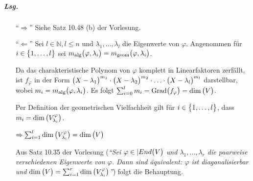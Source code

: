 \documentclass{scrreprt}
\newcommand{\Grad}{\text{Grad}}
\begin{document}
\subparagraph{Lsg.}
\begin{itemize}
\item[``$\Rightarrow$''] Siehe Satz 10.48 (b) der Vorlesung.
\item[``$\Leftarrow$''] Sei $l \in \mathbb{N}, l \leq n$ und
  $\lambda_1, \ldots, \lambda_l$ die Eigenwerte von $\varphi$.
  Angenommen für $i \in \qty\big{1, \ldots, l}$ sei
  $m_{\text{alg}}\qty\big(\varphi, \lambda_i)
  = m_{\text{geom}}\qty\big(\varphi, \lambda_i)$.

  Da das charakteristische Polynom von $\varphi$ komplett in Linearfaktoren
  zerfällt, ist $f_{\varphi}$ in der Form
  $\qty\big(X - \lambda_1)^{m_1} \cdot \qty\big(X - \lambda_2)^{m_2} \cdot \ldots
  \cdot \qty\big(X - \lambda_l)^{m_l}$ darstellbar, wobei
  $m_i = m_{\text{alg}}\qty\big(\varphi, \lambda_i)$.
  Es folgt $\sum_{i = 0}^l m_i = \Grad\qty\big(f_{\varphi}) = \dim\qty\big(V)$.

  Per Definition der geometrischen Vielfachheit gilt für
  $i \in \qty\big{1, \ldots, l}$, dass
  $m_i = \dim\qty\big(V_{\lambda_i}^{\varphi})$.

  $\Rightarrow \sum_{i = 1}^l \dim\qty(V_{\lambda_i}^{\varphi}) =
  \dim\qty\big(V)$

  Aus Satz 10.35 der Vorlesung (\emph{``Sei $\varphi \in |End\qty\big(V)$ und
    $\lambda_1, \ldots, \lambda_r$ die paarweise verschiedenen Eigenwerte von
    $\varphi$.
    Dann sind äquivalent: $\varphi$ ist diagonalisierbar und
    $\dim\qty\big(V) = \sum_{i = 1}^r \dim\qty(V_{\lambda_i}^{\varphi})$''})
  folgt die Behauptung.
\end{itemize}
\end{document}
